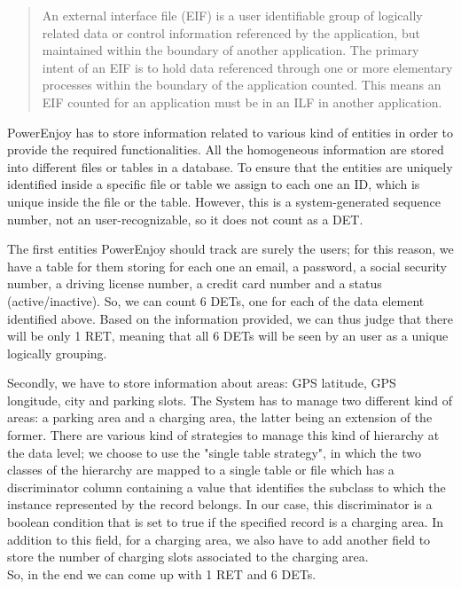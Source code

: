 \begin{quote}
An external interface file (EIF) is a user identifiable group of logically related data or control information referenced by the application, but maintained within the boundary of another application. The primary intent of an EIF is to hold data referenced through one or more elementary processes within the boundary of the application counted. This means an EIF counted for an application must be in an ILF in another application.
\end{quote}

PowerEnjoy has to store information related to various kind of entities in order to provide the required functionalities. All the homogeneous information are stored into different files or tables in a database. To ensure that the entities are uniquely identified inside a specific file or table we assign to each one an ID, which is unique inside the file or the table. However, this is a system-generated sequence number, not an user-recognizable, so it does not count as a DET.
\smallskip

The first entities PowerEnjoy should track are surely the users; for this reason, we have a table for them storing for each one an email, a password, a social security number, a driving license number, a credit card number and a status (active/inactive). 
So, we can count 6 DETs, one for each of the data element identified above. Based on the information provided, we can thus judge that there will be only 1 RET, meaning that all 6 DETs will be seen by an user as a unique logically grouping.
\smallskip

Secondly, we have to store information about areas: GPS latitude, GPS longitude, city and parking slots. The System has to manage two different kind of areas: a parking area and a charging area, the latter being an extension of the former. There are various kind of strategies to manage this kind of hierarchy at the data level; we choose to use the "single table strategy", in which the two classes of the hierarchy are mapped to a single table or file which has a discriminator column containing a value that identifies the subclass to which the instance represented by the record belongs. In our case, this discriminator is a boolean condition that is set to true if the specified record is a charging area. In addition to this field, for a charging area, we also have to add another field to store the number of charging slots associated to the charging area.\\
So, in the end we can come up with 1 RET and 6 DETs.
\smallskip

